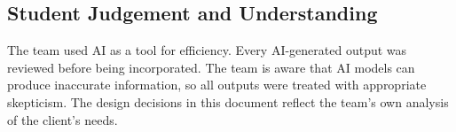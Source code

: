 \subsection{Student Judgement and Understanding}

The team used AI as a tool for efficiency. Every AI-generated output was
reviewed before being incorporated. The team is aware that AI models can produce
inaccurate information, so all outputs were treated with appropriate skepticism.
The design decisions in this document reflect the team's own analysis of the
client's needs.
